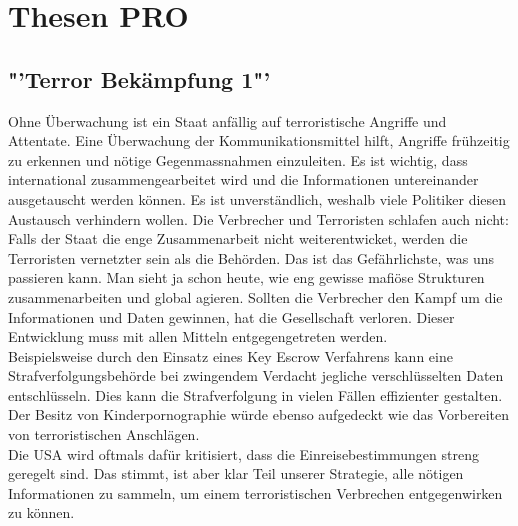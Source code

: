 \section*{Thesen PRO}
\subsection*{"'Terror Bekämpfung 1"'}
Ohne Überwachung ist ein Staat anfällig auf terroristische Angriffe und 
Attentate. Eine Überwachung der Kommunikationsmittel hilft, Angriffe 
frühzeitig zu erkennen und nötige Gegenmassnahmen einzuleiten. Es ist 
wichtig, dass international zusammengearbeitet wird und die 
Informationen untereinander ausgetauscht werden können. Es ist 
unverst\"andlich, weshalb viele Politiker diesen Austausch verhindern wollen. Die 
Verbrecher und Terroristen schlafen auch nicht: Falls der Staat die enge 
Zusammenarbeit nicht weiterentwicket, werden die Terroristen vernetzter sein als 
die Beh\"orden. Das ist das Gefährlichste, was uns passieren kann. Man sieht ja 
schon heute, wie eng gewisse mafiöse Strukturen zusammenarbeiten und 
global agieren. Sollten die Verbrecher den Kampf um die Informationen 
und Daten gewinnen, hat die Gesellschaft verloren. Dieser Entwicklung
muss mit allen Mitteln entgegengetreten werden.\\
Beispielsweise durch den Einsatz eines Key Escrow Verfahrens kann eine 
Strafverfolgungsbehörde bei zwingendem Verdacht jegliche 
verschlüsselten Daten entschlüsseln. Dies kann die Strafverfolgung in 
vielen Fällen effizienter gestalten. Der Besitz von Kinderpornographie 
würde ebenso aufgedeckt wie das Vorbereiten von terroristischen 
Anschlägen.\\
Die USA wird oftmals dafür kritisiert, dass die 
Einreisebestimmungen streng geregelt sind. Das stimmt, ist aber klar 
Teil unserer Strategie, alle nötigen Informationen zu sammeln, um einem 
terroristischen Verbrechen entgegenwirken zu können.

